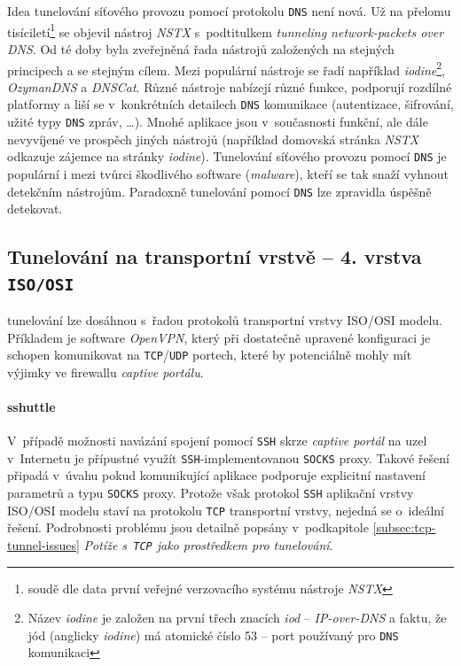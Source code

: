 \documentclass[thesis=M,czech]{FITthesis}[2012/10/20]
\begin{document}
Idea tunelování síťového provozu pomocí protokolu \texttt{DNS} není nová. Už na přelomu tisíciletí\footnote{soudě dle data první veřejné verzovacího systému nástroje \textit{NSTX}} se objevil nástroj \textit{NSTX} s~podtitulkem \textit{tunneling network-packets over DNS}. Od té doby byla zveřejněná řada nástrojů založených na stejných principech a se stejným cílem. Mezi populární\cite{sans-dns-tunels} nástroje se řadí například \textit{iodine}\footnote{Název \textit{iodine} je založen na první třech znacích \textit{iod} -- \textit{IP-over-DNS} a faktu, že jód (anglicky \textit{iodine}) má atomické číslo 53 -- port používaný pro \texttt{DNS} komunikaci}, \textit{OzymanDNS} a \textit{DNSCat}. Různé nástroje nabízejí různé funkce, podporují rozdílné platformy a liší se v~konkrétních detailech \texttt{DNS} komunikace (autentizace, šifrování, užité typy \texttt{DNS} zpráv, \ldots). Mnohé aplikace jsou v~současnosti funkční, ale dále nevyvíjené ve prospěch jiných nástrojů (například domovská stránka \textit{NSTX} odkazuje zájemce na stránky \textit{iodine}). Tunelování síťového provozu pomocí \texttt{DNS} je populární\cite{sans-dns-tunels} i mezi tvůrci škodlivého software (\textit{malware}), kteří se tak snaží vyhnout detekčním nástrojům. Paradoxně tunelování pomocí \texttt{DNS} lze zpravidla úspěšně detekovat\cite{bakalarka-detekce-tunelu}.


\subsection{Tunelování na transportní vrstvě -- 4. vrstva \texttt{ISO/OSI}}

 tunelování lze dosáhnou s~řadou protokolů transportní vrstvy ISO/OSI modelu. Příkladem je software \textit{OpenVPN}, který při dostatečně upravené konfiguraci je schopen komunikovat na \texttt{TCP}/\texttt{UDP} portech, které by potenciálně mohly mít výjimky ve firewallu \textit{captive portálu}.

\paragraph{sshuttle}

V~případě možnosti navázání spojení pomocí \texttt{SSH} skrze \textit{captive portál} na uzel v~Internetu je přípustné využít \texttt{SSH}-implementovanou \texttt{SOCKS} proxy. Takové řešení připadá v~úvahu pokud komunikující aplikace podporuje explicitní nastavení parametrů a typu \texttt{SOCKS} proxy. Protože však protokol \texttt{SSH} aplikační vrstvy ISO/OSI modelu staví na protokolu \texttt{TCP} transportní vrstvy, nejedná se o~ideální řešení. Podrobnosti problému jsou detailně popsány v~podkapitole \ref{subsec:tcp-tunnel-issues} \textit{Potíže s~\texttt{TCP} jako prostředkem pro tunelování}.
\end{document}
